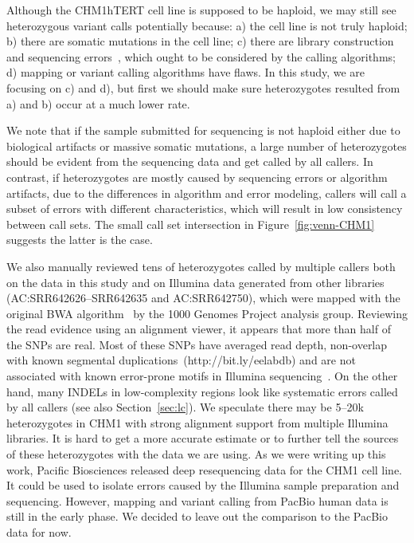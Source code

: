 \documentclass{bioinfo-ori}
\begin{document}
Although the CHM1hTERT cell line is supposed to be haploid, we may still see
heterozygous variant calls potentially because: a) the cell line is not truly
haploid; b) there are somatic mutations in the cell line; c) there are
library construction and sequencing errors~\citep{Robasky:2014aa}, which ought
to be considered by the calling algorithms; d) mapping or variant calling
algorithms have flaws. In this study, we are focusing on c) and d), but first
we should make sure heterozygotes resulted from a) and b) occur at a much lower
rate.

We note that if the sample submitted for sequencing is not haploid either due
to biological artifacts or massive somatic mutations, a large number of
heterozygotes should be evident from the sequencing data and get called by all
callers. In contrast, if heterozygotes are mostly caused by sequencing errors
or algorithm artifacts, due to the differences in algorithm and error modeling,
callers will call a subset of errors with different characteristics, which will
result in low consistency between call sets. The small call set intersection in
Figure~\ref{fig:venn-CHM1} suggests the latter is the case.

We also manually reviewed tens of heterozygotes called by multiple callers both
on the data in this study and on Illumina data generated from other libraries
(AC:SRR642626--SRR642635 and AC:SRR642750), which were mapped with the original BWA
algorithm~\citep{Li:2009uq} by the 1000 Genomes Project analysis group.
Reviewing the read evidence using an alignment viewer, it appears that more than half of the SNPs are real.
Most of these SNPs have averaged read depth, non-overlap with known segmental duplications~(http://bit.ly/eelabdb)
and are not associated with known error-prone motifs in Illumina sequencing~\citep{Nakamura:2011aa}.
On the other hand, many INDELs in low-complexity regions look like systematic errors called by
all callers (see also Section~\ref{sec:lc}).  We speculate there may be 5--20k
heterozygotes in CHM1 with strong alignment support from multiple Illumina
libraries. It is hard to get a more accurate estimate or to further tell the
sources of these heterozygotes with the data we are using. As we were writing up
this work, Pacific Biosciences released deep resequencing data for the CHM1
cell line. It could be used to isolate errors caused by the Illumina
sample preparation and sequencing. However, mapping and variant calling from
PacBio human data is still in the early phase. We decided to leave out the comparison
to the PacBio data for now.
\end{document}
